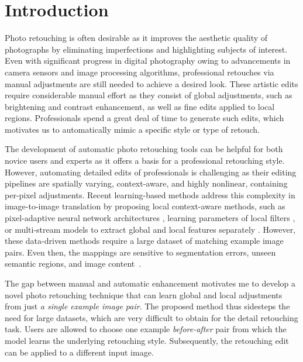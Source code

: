


\section{Introduction}\label{sec:introduction}

Photo retouching is often desirable as it improves the aesthetic quality of photographs by eliminating imperfections and \nobreak highlighting subjects of interest. Even with significant progress in digital photography owing to advancements in camera sensors and image processing algorithms, professional retouches via manual adjustments are still needed to achieve a desired look. These artistic edits require considerable manual effort as they consist of global adjustments, such as brightening and contrast enhancement, as well as fine edits applied to local regions. Professionals spend a great deal of time to generate such edits, which motivates us to automatically mimic a specific style or type of retouch.

The development of automatic photo retouching tools can be helpful for both novice users and experts as it offers a basis for a professional retouching style. However, automating detailed edits of professionals is challenging as their editing pipelines are spatially varying, context-aware, and highly nonlinear, containing per-pixel adjustments. Recent learning-based methods address this complexity in image-to-image translation by proposing local context-aware methods, such as pixel-adaptive neural network architectures \cite{shaham2021spatially, li2020lapar}, learning parameters of local filters \cite{moran2020deeplpf}, or multi-stream models to extract global and local features separately \cite{Gharbi17Deep}. However, these data-driven methods require a large dataset of matching example image pairs. Even then, the mappings are sensitive to segmentation errors, unseen semantic regions, and image content~\cite{yan2016automatic}. %

The gap between manual and automatic enhancement motivates me to develop a novel photo retouching technique that can learn global and local adjustments from just \emph{a single example image pair}. The proposed method thus sidesteps the need for large datasets, which are very difficult to obtain for the detail retouching task. Users are allowed to choose one example \emph{before-after} pair from which the model learns the underlying retouching style. Subsequently, the retouching edit can be applied to a different input image.

